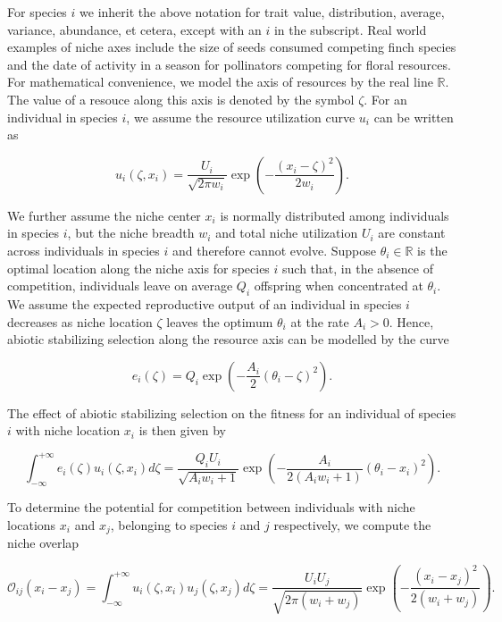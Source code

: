 \documentclass[]{article}
\begin{document}
For species \(i\) we inherit the above notation for trait value,
distribution, average, variance, abundance, et cetera, except with an
\(i\) in the subscript. Real world examples of niche axes include the
size of seeds consumed competing finch species and the date of activity
in a season for pollinators competing for floral resources. For
mathematical convenience, we model the axis of resources by the real
line \(\mathbb{R}\). The value of a resouce along this axis is denoted
by the symbol \(\zeta\). For an individual in species \(i\), we assume
the resource utilization curve \(u_i\) can be written as

\begin{equation}
u_i(\zeta,x_i)=\frac{U_i}{\sqrt{2\pi w_i}}\exp\left(-\frac{(x_i-\zeta)^2}{2w_i}\right).
\end{equation}

We further assume the niche center \(x_i\) is normally distributed among
individuals in species \(i\), but the niche breadth \(w_i\) and total
niche utilization \(U_i\) are constant across individuals in species
\(i\) and therefore cannot evolve. Suppose \(\theta_i\in\mathbb R\) is
the optimal location along the niche axis for species \(i\) such that,
in the absence of competition, individuals leave on average \(Q_i\)
offspring when concentrated at \(\theta_i\). We assume the expected
reproductive output of an individual in species \(i\) decreases as niche
location \(\zeta\) leaves the optimum \(\theta_i\) at the rate
\(A_i>0\). Hence, abiotic stabilizing selection along the resource axis
can be modelled by the curve

\begin{equation}
e_i(\zeta)=Q_i\exp\left(-\frac{A_i}{2}(\theta_i-\zeta)^2\right).
\end{equation}

The effect of abiotic stabilizing selection on the fitness for an
individual of species \(i\) with niche location \(x_i\) is then given by

\begin{equation}
\int_{-\infty}^{+\infty}e_i(\zeta)u_i(\zeta,x_i)d\zeta=\frac{Q_iU_i}{\sqrt{A_iw_i+1}}\exp\left(-\frac{A_i}{2(A_iw_i+1)}(\theta_i-x_i)^2\right).
\end{equation}

To determine the potential for competition between individuals with
niche locations \(x_i\) and \(x_j\), belonging to species \(i\) and
\(j\) respectively, we compute the niche overlap

\begin{equation}
\mathcal O_{ij}(x_i-x_j)=\int_{-\infty}^{+\infty}u_i(\zeta,x_i)u_j(\zeta,x_j)d\zeta=\frac{U_iU_j}{\sqrt{2\pi(w_i+w_j)}}\exp\left(-\frac{(x_i-x_j)^2}{2(w_i+w_j)}\right).
\end{equation}
\end{document}
